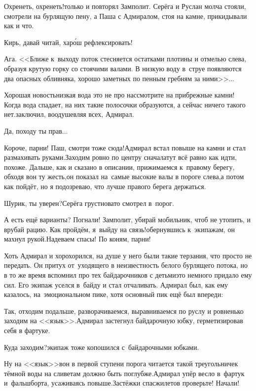 \diagdash Охренеть, охренеть!\mdash только и повторял Замполит. Серёга и Руслан молча стояли, смотрели на бурлящую пену, а Паша с Адмиралом, стоя на камне, прикидывали как и что.

\diagdash Кирь, давай читай, хар{\'о}ш рефлексировать!

\diagdash Ага. <<Ближе к~выходу поток стесняется остатками плотины и отмелью слева, образуя крутую горку со стоячими валами. В низкую воду в~струе появляются два опасных обливняка, хорошо заметных по пенным гребням за ними>>$\ldots$

\diagdash Хорошая новость\mdash низкая вода это не про нас\mdash смотрите на прибрежные камни! Когда вода спадает, на них такие полосочки образуются, а сейчас ничего такого нет.\mdash заключил, воодушевляя всех, Адмирал.

\diagdash Да, походу ты прав$\ldots$

\diagdash Короче, парни! Паш, смотри тоже сюда!\mdash Адмирал встал повыше на камни и стал размахивать руками.\mdash Заходим ровно по центру сначала\mdash тут всё равно как идти, похоже. Дальше, как и сказано в описании, прижимаемся к~правому берегу, обходя вон ту жесть,\mdash он показал на~самые высокие валы в пороге слева,\mdash а потом как пойдёт, но я подозреваю, что лучше правого берега держаться.

\diagdash Шурик, ты уверен?\mdash Серёга грустновато смотрел в~порог.

\diagdash А есть ещё варианты? Погнали! Замполит, убирай мобильник, чтоб не утопить, и врубай рацию. Как пройдём, я~выйду на связь!\mdash обернувшись к~экипажам, он махнул рукой.\mdash Надеваем спасы! По коням, парни!

Хоть Адмирал и хорохорился, на душе у него были такие терзания, что просто не передать. Он притух от~уходящего в неизвестность белого бурлящего потока, но в то же время вспомнил про тех байдарочников с детьми\mdash это немного придало ему сил. Его экипаж уселся в~байду и стал отчаливать. Адмирал был, как ему казалось, на~эмоциональном пике, хотя основный пик ещё был впереди:

\diagdash Так, отходим подальше, разворачиваемся, выравниваемся по руслу и ровненько заходим на <<язык>>.\mdash Адмирал застегнул байдарочную юбку, герметизировав себя в фартуке.

\diagdash Куда заходим?\mdash экипаж тоже копошился с~байдарочными юбками.

\diagdash Ну на <<язык>>\mdash вон в первой ступени порога читается такой треугольничек тёмной воды на сливе\mdash там должно быть поглубже.\mdash Адмирал упёр весло в~фартук и~фальшборта, усаживаясь повыше.\mdash Застёжки спасжилетов проверьте! Начали!


